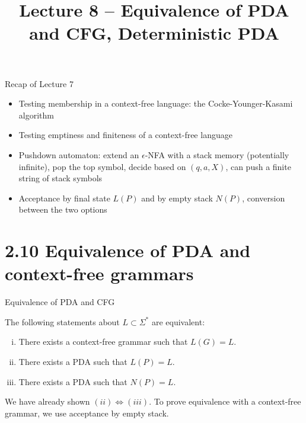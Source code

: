 \documentclass[handout]{beamer}
\title{Lecture 8 -- Equivalence of PDA and CFG, Deterministic PDA}
\begin{document}
\frame{\titlepage}


\begin{frame}{Recap of Lecture 7}
	
    \begin{itemize}    
        \item Testing membership in a context-free language: the Cocke-Younger-Kasami algorithm
        \item Testing emptiness and finiteness of a context-free language    
		\item Pushdown automaton: extend an $\epsilon$-NFA with a stack memory (potentially infinite), pop the top symbol, decide based on $(q,a,X)$, can push a finite string of stack symbols
        \item Acceptance by final state $L(P)$ and by empty stack $N(P)$, conversion between the two options        	
	\end{itemize}

\end{frame}



\section*{2.10 Equivalence of PDA and context-free grammars}


\begin{frame}{Equivalence of PDA and CFG}

    \begin{theorem}
        The following statements about $L\subset\Sigma^*$ are equivalent:
        \begin{enumerate}[(i)]
            \item There exists a context-free grammar such that $L(G)=L$.
            \item There exists a PDA such that $L(P)=L$.
            \item There exists a PDA such that $N(P)=L$.
        \end{enumerate}
    \end{theorem}
        
    \begin{center}
    \end{center}

    We have already shown $(ii)\Leftrightarrow(iii)$. To prove equivalence with a context-free grammar, we use acceptance by empty stack.

\end{frame}
\end{document}

